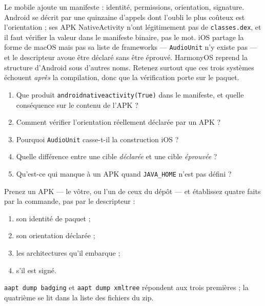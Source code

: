 \begin{nkbilan}
Le mobile ajoute un manifeste : identité, permissions, orientation, signature.
Android se décrit par une quinzaine d'appels dont l'oubli le plus coûteux est
l'orientation ; ses APK NativeActivity n'ont légitimement pas de
\texttt{classes.dex}, et il faut vérifier la valeur dans le manifeste binaire, pas
le mot. iOS partage la forme de macOS mais pas sa liste de frameworks ---
\texttt{AudioUnit} n'y existe pas --- et le descripteur avoue être déclaré sans
être éprouvé. HarmonyOS reprend la structure d'Android sous d'autres noms.
Retenez surtout que ces trois systèmes échouent \emph{après} la compilation, donc
que la vérification porte sur le paquet.
\end{nkbilan}

\begin{nkquestions}
\begin{enumerate}
\item Que produit \texttt{androidnativeactivity(True)} dans le manifeste, et
      quelle conséquence sur le contenu de l'APK ?
\item Comment vérifier l'orientation réellement déclarée par un APK ?
\item Pourquoi \texttt{AudioUnit} casse-t-il la construction iOS ?
\item Quelle différence entre une cible \emph{déclarée} et une cible
      \emph{éprouvée} ?
\item Qu'est-ce qui manque à un APK quand \texttt{JAVA\_HOME} n'est pas défini ?
\end{enumerate}
\end{nkquestions}

\begin{nkpratique}
Prenez un APK --- le vôtre, ou l'un de ceux du dépôt --- et établissez quatre
faits par la commande, pas par le descripteur :

\begin{enumerate}
\item son identité de paquet ;
\item son orientation déclarée ;
\item les architectures qu'il embarque ;
\item s'il est signé.
\end{enumerate}

\texttt{aapt dump badging} et \texttt{aapt dump xmltree} répondent aux trois
premières ; la quatrième se lit dans la liste des fichiers du zip.
\end{nkpratique}

